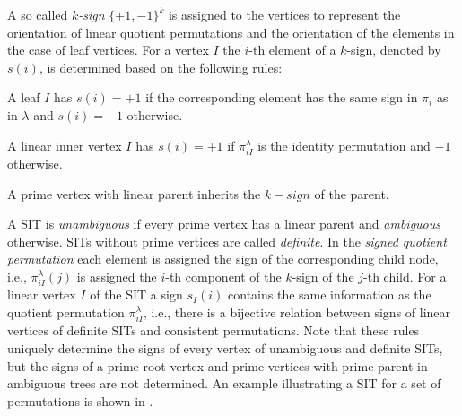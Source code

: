 \documentclass{svmult}
\newcommand{\MB}[2]{{\textcolor{gray}{#1}}\textcolor{blue}{#2}}
\newcommand{\m}[1]{\mathcal{#1}}
\begin{document}
A so called \emph{$k$-sign} $\{+1,-1\}^k$ is assigned to the vertices to represent
the orientation of linear quotient permutations and the orientation of the elements in the case of leaf vertices. 
%
For a vertex $I$ the $i$-th element of a $k$-sign, denoted by $s(i)$, is
determined based on the following rules:
\begin{inparaenum}[i)]
\item A leaf $I$ has $s(i)=+1$ if the corresponding element has the same sign
	in $\pi_i$ as in $\lambda$ and $s(i)=-1$ otherwise. 
\item A linear inner vertex $I$ has $s(i)=+1$ if $\pi_{iI}^\lambda$ is the
	identity permutation and $-1$ otherwise.
\item A prime vertex with linear parent inherits the $k-sign$ of the parent. 
\end{inparaenum}
A SIT is \emph{unambiguous} if every prime vertex has a linear parent and
\emph{ambiguous} otherwise.
SITs without prime vertices are called \emph{definite}.
In the \emph{signed quotient permutation} each element is assigned the sign of the 
corresponding child node, i.e., $\pi_{iI}^\lambda(j)$ is assigned the $i$-th 
component of the $k$-sign of the $j$-th child. 
For a linear vertex $I$ of the SIT a sign $s_I(i)$ contains the same
information as the quotient permutation $\pi_{iI}^\lambda$, i.e., there is a
bijective relation between signs of linear vertices of definite SITs and
consistent permutations.
Note that these rules uniquely determine the signs of every vertex of
unambiguous and definite SITs, but 
the signs of a prime root vertex and prime vertices with prime parent in 
ambiguous trees are not determined.
An example illustrating a SIT for a set of permutations is shown in
.
\end{document}
